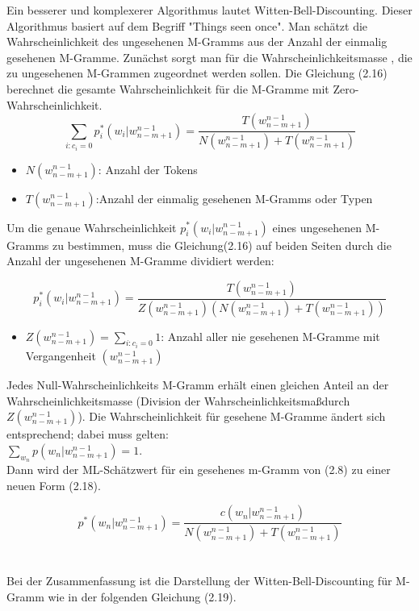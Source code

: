 Ein besserer und komplexerer Algorithmus lautet Witten-Bell-Discounting.
Dieser Algorithmus basiert auf dem Begriff "Things seen once". Man sch\"atzt die Wahrscheinlichkeit des ungesehenen M-Gramms aus der Anzahl der einmalig gesehenen M-Gramme. Zun\"achst sorgt man f\"ur die Wahrscheinlichkeitsmasse , die zu ungesehenen M-Grammen zugeordnet werden sollen. Die Gleichung (2.16) berechnet die  gesamte Wahrscheinlichkeit f\"ur  die M-Gramme mit Zero-Wahrscheinlichkeit.
\begin{equation}
\label{equation:witten_bell_01}
\sum_{i:c_{i}=0}p_{i}^{*}(w_{i}|w_{n-m+1}^{n-1})=\frac{T(w_{n-m+1}^{n-1})}{N(w_{n-m+1}^{n-1})+T(w_{n-m+1}^{n-1})}
\end{equation}
\begin{itemize}
	\item $N(w_{n-m+1}^{n-1})$: Anzahl der Tokens\\
	\item $T(w_{n-m+1}^{n-1})$:Anzahl der einmalig gesehenen M-Gramms oder Typen
\end{itemize}
Um die genaue Wahrscheinlichkeit $p_{i}^{*}(w_{i}|w_{n-m+1}^{n-1})$ eines ungesehenen M-Gramms zu bestimmen, muss die Gleichung(2.16) auf beiden Seiten durch die Anzahl der ungesehenen M-Gramme dividiert werden:

\begin{equation}
\label{equation:witten_bell_02}
p_{i}^{*}(w_{i}|w_{n-m+1}^{n-1})=\frac{T(w_{n-m+1}^{n-1})}{Z(w_{n-m+1}^{n-1})(N(w_{n-m+1}^{n-1})+T(w_{n-m+1}^{n-1}))}
\end{equation}
\begin{itemize}
	\item $Z(w_{n-m+1}^{n-1})=\sum_{i:c_{i}=0}1$: Anzahl aller nie gesehenen M-Gramme mit Vergangenheit $(w_{n-m+1}^{n-1})$
\end{itemize}
Jedes Null-Wahrscheinlichkeits M-Gramm erh\"alt einen gleichen Anteil an der Wahrscheinlichkeitsmasse (Division der Wahrscheinlichkeitsma\ss durch $Z(w_{n-m+1}^{n-1})$).
Die Wahrscheinlichkeit f\"ur gesehene M-Gramme \"andert sich entsprechend; dabei muss gelten:\\ 
$\sum_{w_{n}}p(w_{n}|w_{n-m+1}^{n-1})=1$.\\
Dann wird der ML-Sch\"atzwert  f\"ur ein gesehenes m-Gramm von (2.8) zu einer neuen Form (2.18). 

\begin{equation}
\label{equation:witten_bell_03}
p^{*}(w_{n}|w_{n-m+1}^{n-1})=\frac{c(w_{n}|w_{n-m+1}^{n-1})}{N(w_{n-m+1}^{n-1})+T(w_{n-m+1}^{n-1})}
\end{equation}
\\
\\
Bei der Zusammenfassung ist die Darstellung der Witten-Bell-Discounting f\"ur M-Gramm wie in der folgenden Gleichung (2.19).

